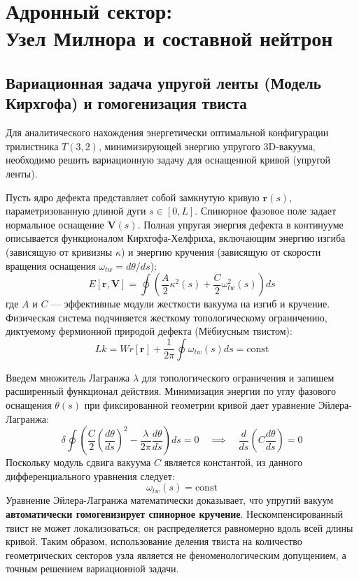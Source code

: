 \documentclass[12pt,a4paper]{article}
\begin{document}
	\section{Адронный сектор:\\ Узел Милнора и составной нейтрон}
	
	\subsection{Вариационная задача упругой ленты (Модель Кирхгофа) и гомогенизация твиста}
	Для аналитического нахождения энергетически оптимальной конфигурации трилистника $T(3,2)$, минимизирующей энергию упругого 3D-вакуума, необходимо решить вариационную задачу для оснащенной кривой (упругой ленты).
	
	Пусть ядро дефекта представляет собой замкнутую кривую $\mathbf{r}(s)$, параметризованную длиной дуги $s \in [0, L]$. Спинорное фазовое поле задает нормальное оснащение $\mathbf{V}(s)$. Полная упругая энергия дефекта в континууме описывается функционалом Кирхгофа-Хелфриха, включающим энергию изгиба (зависящую от кривизны $\kappa$) и энергию кручения (зависящую от скорости вращения оснащения $\omega_{tw} = d\theta/ds$):
	\begin{equation}
		E[\mathbf{r}, \mathbf{V}] = \oint \left( \frac{A}{2} \kappa^2(s) + \frac{C}{2} \omega_{tw}^2(s) \right) ds
	\end{equation}
	где $A$ и $C$ — эффективные модули жесткости вакуума на изгиб и кручение. 
	Физическая система подчиняется жесткому топологическому ограничению, диктуемому фермионной природой дефекта (Мёбиусным твистом):
	\begin{equation}
		Lk = Wr[\mathbf{r}] + \frac{1}{2\pi} \oint \omega_{tw}(s) ds = \text{const}
	\end{equation}
	
	Введем множитель Лагранжа $\lambda$ для топологического ограничения и запишем расширенный функционал действия. Минимизация энергии по углу фазового оснащения $\theta(s)$ при фиксированной геометрии кривой дает уравнение Эйлера-Лагранжа:
	\begin{equation}
		\delta \oint \left( \frac{C}{2} \left(\frac{d\theta}{ds}\right)^2 - \frac{\lambda}{2\pi} \frac{d\theta}{ds} \right) ds = 0 \quad \implies \quad \frac{d}{ds} \left( C \frac{d\theta}{ds} \right) = 0
	\end{equation}
	Поскольку модуль сдвига вакуума $C$ является константой, из данного дифференциального уравнения следует:
	\begin{equation}
		\omega_{tw}(s) = \text{const}
	\end{equation}
	Уравнение Эйлера-Лагранжа математически доказывает, что упругий вакуум \textbf{автоматически гомогенизирует спинорное кручение}. Нескомпенсированный твист не может локализоваться; он распределяется равномерно вдоль всей длины кривой. Таким образом, использование деления твиста на количество геометрических секторов узла является не феноменологическим допущением, а точным решением вариационной задачи.
	
\end{document}
